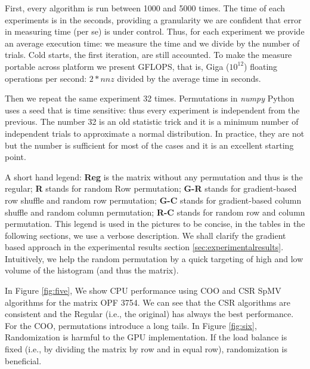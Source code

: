 \documentclass[manuscript,screen]{acmart}
\begin{document}
First, every algorithm is run between 1000 and 5000 times. The time of
each experiments is in the seconds, providing a granularity we are
confident that error in measuring time (per se) is under
control. Thus, for each experiment we provide an average execution
time: we measure the time and we divide by the number of trials. Cold
starts, the first iteration, are still accounted. To make the measure
portable across platform we present GFLOPS, that is, Giga ($10^{12}$)
floating operations per second: $2*nnz$ divided by the average time in
seconds.

Then we repeat the same experiment 32 times. Permutations in {\em
  numpy} Python uses a seed that is time sensitive: thus every
experiment is independent from the previous. The number 32 is an old
statistic trick and it is a minimum number of independent trials to
approximate a normal distribution. In practice, they are not but the
number is sufficient for most of the cases and it is an excellent
starting point.

A short hand legend: {\bf Reg} is the matrix without any permutation
and thus is the regular; {\bf R} stands for random Row permutation;
{\bf G-R} stands for gradient-based row shuffle and random row
permutation; {\bf G-C} stands for gradient-based column shuffle and
random column permutation; {\bf R-C} stands for random row and column
permutation.  This legend is used in the pictures to be concise, in
the tables in the following sections, we use a verbose description. We
shall clarify the gradient based approach in the experimental results
section \ref{sec:experimentalresults}. Intuitively, we help the random
permutation by a quick targeting of high and low volume of the
histogram (and thus the matrix).


In Figure \ref{fig:five}, We show CPU performance using COO and CSR
SpMV algorithms for the matrix OPF 3754. We can see that the CSR
algorithms are consistent and the Regular (i.e., the original) has
always the best performance. For the COO, permutations introduce a
long tails. In Figure \ref{fig:six}, Randomization is harmful to the
GPU implementation. If the load balance is fixed (i.e., by dividing
the matrix by row and in equal row), randomization is beneficial.


\end{document}
